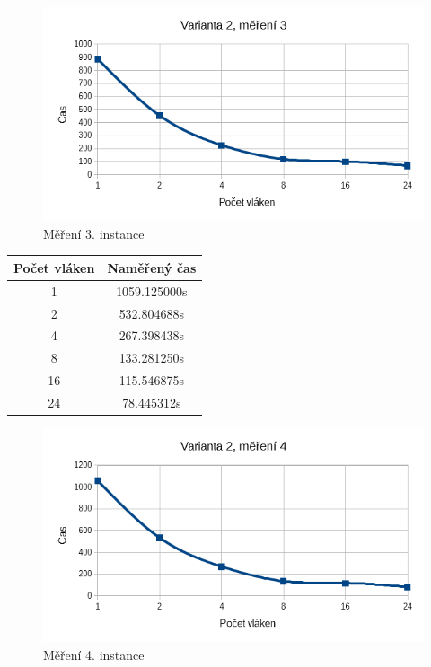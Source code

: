 \documentclass[12pt]{article}
\begin{document}
\begin{figure}[H]
  \begin{center}
     \includegraphics[width=12cm]{images/sse3.png}
    \caption{Měření 3. instance} 
  \end{center}
\end{figure}
%
%
\begin{center}
\begin{tabular}{ c | c }
\textbf{Počet vláken} & \textbf{Naměřený čas} \\ \hline \hline 
1 & 1059.125000s \\ \hline
2 & 532.804688s \\ \hline
4 & 267.398438s \\ \hline
8 & 133.281250s \\ \hline
16 & 115.546875s \\ \hline
24 & 78.445312s \\ \hline
\end{tabular}
\end{center}

\begin{figure}[H]
  \begin{center}
     \includegraphics[width=12cm]{images/sse4.png}
    \caption{Měření 4. instance} 
  \end{center}
\end{figure}
\end{document}
